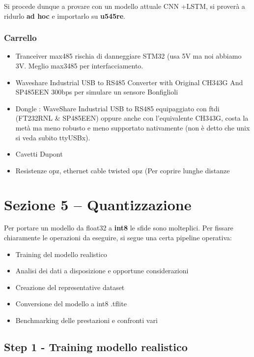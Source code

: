 Si procede dunque a provare con un modello attuale CNN +LSTM, si proverà a ridurlo \textbf{ad hoc} e importarlo su \textbf{u545re}.

\subsubsection{Carrello}

\begin{itemize}
    \item Tranceiver max485 rischia di danneggiare STM32 (usa 5V ma noi abbiamo 3V. Meglio max3485 per interfacciamento.
    \item Waveshare Industrial USB to RS485 Converter with Original CH343G And SP485EEN 300bps per simulare un sensore Bonfiglioli
    \item Dongle : WaveShare Industrial USB to RS485 equipaggiato con ftdi (FT232RNL \& SP485EEN) oppure anche con l'equivalente CH343G, costa la metà ma meno robusto e meno supportato nativamente (non è detto che unix si veda subito ttyUSBx).
    \item Cavetti Dupont
    \item Resistenze opz, ethernet cable twisted opz (Per coprire lunghe distanze
\end{itemize}


\section{Sezione 5 -- Quantizzazione}

Per portare un modello da float32 a \textbf{int8} le sfide sono molteplici. Per fissare chiaramente le operazioni da eseguire, si segue una certa pipeline operativa:

\begin{itemize}
    \item Training del modello realistico
    \item Analisi dei dati a disposizione e opportune considerazioni
    \item Creazione del representative dataset
    \item Conversione del modello a int8 .tflite
    \item Benchmarking delle prestazioni e confronti vari
\end{itemize}

\subsection{Step 1 - Training modello realistico}

